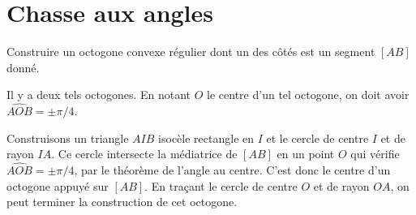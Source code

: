 

\chapter{Chasse aux angles}

\begin{exo}
Construire un octogone convexe régulier dont un des côtés est un segment $[AB]$ donné.

\begin{hint}   
Il y a deux tels octogones. En notant $O$ le centre d'un tel octogone, on doit avoir $\widehat{AOB}=\pm \pi/4$.
\end{hint}      
\begin{sol}  
Construisons un triangle $AIB$ isocèle rectangle en $I$ et le cercle de centre $I$ et de rayon $IA$. Ce cercle intersecte la médiatrice de $[AB]$ en un point $O$ qui vérifie $\widehat{AOB}=\pm \pi/4$, par le théorème de l'angle au centre. C'est donc le centre d'un octogone appuyé sur $[AB]$. En traçant le cercle de centre $O$ et de rayon $OA$, on peut terminer la construction de cet octogone.
\end{sol}  
\end{exo}  



